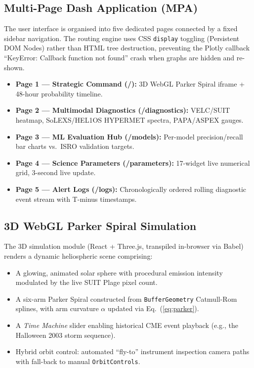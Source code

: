 \documentclass[conference,10pt,twocolumn]{IEEEtran}
\begin{document}
\subsection{Multi-Page Dash Application (MPA)}
The user interface is organised into five dedicated pages connected by a fixed sidebar navigation. The routing engine uses CSS \texttt{display} toggling (Persistent DOM Nodes) rather than HTML tree destruction, preventing the Plotly callback ``KeyError: Callback function not found'' crash when graphs are hidden and re-shown.

\begin{itemize}
  \item \textbf{Page 1 --- Strategic Command (/):} 3D WebGL Parker Spiral iframe + 48-hour probability timeline.
  \item \textbf{Page 2 --- Multimodal Diagnostics (/diagnostics):} VELC/SUIT heatmap, SoLEXS/HEL1OS HYPERMET spectra, PAPA/ASPEX gauges.
  \item \textbf{Page 3 --- ML Evaluation Hub (/models):} Per-model precision/recall bar charts vs.\ ISRO validation targets.
  \item \textbf{Page 4 --- Science Parameters (/parameters):} 17-widget live numerical grid, 3-second live update.
  \item \textbf{Page 5 --- Alert Logs (/logs):} Chronologically ordered rolling diagnostic event stream with T-minus timestamps.
\end{itemize}

\subsection{3D WebGL Parker Spiral Simulation}
The 3D simulation module (React + Three.js, transpiled in-browser via Babel) renders a dynamic heliospheric scene comprising:
\begin{itemize}
  \item A glowing, animated solar sphere with procedural emission intensity modulated by the live SUIT Plage pixel count.
  \item A six-arm Parker Spiral constructed from \texttt{BufferGeometry} Catmull-Rom splines, with arm curvature $\alpha$ updated via Eq.~(\ref{eq:parker}).
  \item A \textit{Time Machine} slider enabling historical CME event playback (e.g., the Halloween 2003 storm sequence).
  \item Hybrid orbit control: automated ``fly-to'' instrument inspection camera paths with fall-back to manual \texttt{OrbitControls}.
\end{itemize}
\end{document}
